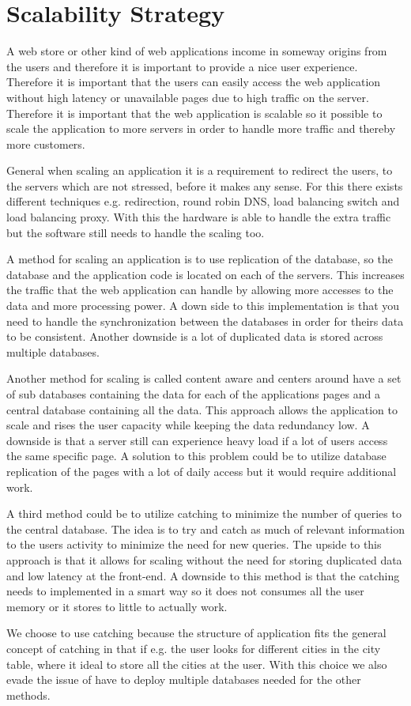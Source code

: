 \section{Scalability Strategy}
A web store or other kind of web applications income in someway origins from the users and therefore it is important to provide a nice user experience. Therefore it is important that the users can easily access the web application without high latency or unavailable pages due to high traffic on the server. Therefore it is important that the web application is scalable so it possible to scale the application to more servers in order to handle more traffic and thereby more customers.

General when scaling an application it is a requirement to redirect the users, to the servers which are not stressed, before it makes any sense. For this there exists different techniques e.g. redirection, round robin DNS, load balancing switch and load balancing proxy. With this the hardware is able to handle the extra traffic but the software still needs to handle the scaling too.

A method for scaling an application is to use replication of the database, so the database and the application code is located on each of the servers. This increases the traffic that the web application can handle by allowing more accesses to the data and more processing power. A down side to this implementation is that you need to handle the synchronization between the databases in order for theirs data to be consistent. Another downside is a lot of duplicated data is stored across multiple databases.

Another method for scaling is called content aware and centers around have a set of sub databases containing the data for each of the applications pages and a central database containing all the data. This approach allows the application to scale and rises the user capacity while keeping the data redundancy low. A downside is that a server still can experience heavy load if a lot of users access the same specific page. A solution to this problem could be to utilize database replication of the pages with a lot of daily access but it would require additional work.

A third method could be to utilize catching to minimize the number of queries to the central database. The idea is to try and catch as much of relevant information to the users activity to minimize the need for new queries. The upside to this approach is that it allows for scaling without the need for storing duplicated data and low latency at the front-end. A downside to this method is that the catching needs to implemented in a smart way so it does not consumes all the user memory or it stores to little to actually work.

We choose to use catching because the structure of application fits the general concept of catching in that if e.g. the user looks for different cities in the city table, where it ideal to store all the cities at the user. With this choice we also evade the issue of have to deploy multiple databases needed for the other methods.